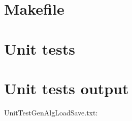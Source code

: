 \section{Makefile}

\begin{scriptsize}
\begin{ttfamily}

\end{ttfamily}
\end{scriptsize}

\section{Unit tests}

\begin{scriptsize}
\begin{ttfamily}

\end{ttfamily}
\end{scriptsize}

\section{Unit tests output}

\begin{scriptsize}
\begin{ttfamily}

\end{ttfamily}
\end{scriptsize}

UnitTestGenAlgLoadSave.txt:\\
\begin{scriptsize}
\begin{ttfamily}

\end{ttfamily}
\end{scriptsize}
